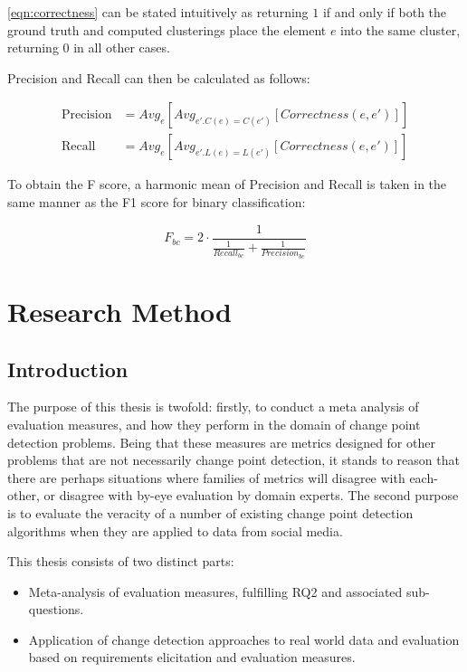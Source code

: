\documentclass{uvamscse}	%
\begin{document}
	\autoref{eqn:correctness} can be stated intuitively as returning $1$ if and only if both the ground truth and computed clusterings place the element $e$ into the same cluster, returning $0$ in all other cases.
	
	Precision and Recall can then be calculated as follows:
	
    \begin{align}
    \label{eqn:bcubed-precision}
        \text{Precision} &= Avg_e [Avg_{e' . C(e) = C(e')}[Correctness(e,e')]]\\
        \label{eqn:bcubed-recall}
        \text{Recall} &= Avg_e [Avg_{e' . L(e) = L(e')}[Correctness(e,e')]]
    \end{align}

To obtain the F score, a harmonic mean of Precision and Recall is taken in the same manner as the F1 score for binary classification:

\begin{equation}
    F_{bc} = 2 \cdot \frac{1}{\frac{1}{Recall_{bc}} + \frac{1}{Precision_{bc}}}
\end{equation}

\chapter{Research Method}
\label{Research Method}

\section{Introduction}

The purpose of this thesis is twofold: firstly, to conduct a meta analysis of evaluation measures, and how they perform in the domain of change point detection problems. Being that these measures are metrics designed for other problems that are not necessarily change point detection, it stands to reason that there are perhaps situations where families of metrics will disagree with each-other, or disagree with by-eye evaluation by domain experts. The second purpose is to evaluate the veracity of a number of existing change point detection algorithms when they are applied to data from social media.

This thesis consists of two distinct parts:

\begin{itemize}
  \item Meta-analysis of evaluation measures, fulfilling RQ2 and associated sub-questions.
  \item Application of change detection approaches to real world data and evaluation based on requirements elicitation and evaluation measures.
\end{itemize}
\end{document}
